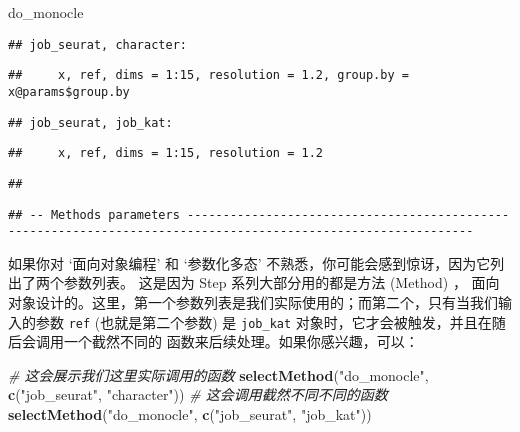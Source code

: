 \documentclass[
]{article}
\newenvironment{Shaded}{\begin{snugshade}}{\end{snugshade}}
\newcommand{\CommentTok}[1]{\textcolor[rgb]{0.56,0.35,0.01}{\textit{#1}}}
\newcommand{\KeywordTok}[1]{\textcolor[rgb]{0.13,0.29,0.53}{\textbf{#1}}}
\newcommand{\NormalTok}[1]{#1}
\newcommand{\StringTok}[1]{\textcolor[rgb]{0.31,0.60,0.02}{#1}}
\begin{document}
\begin{Shaded}
\begin{Highlighting}[]
\NormalTok{do\_monocle}
\end{Highlighting}
\end{Shaded}

\begin{verbatim}
## job_seurat, character:
\end{verbatim}

\begin{verbatim}
##     x, ref, dims = 1:15, resolution = 1.2, group.by = x@params$group.by
\end{verbatim}

\begin{verbatim}
## job_seurat, job_kat:
\end{verbatim}

\begin{verbatim}
##     x, ref, dims = 1:15, resolution = 1.2
\end{verbatim}

\begin{verbatim}
## 
\end{verbatim}

\begin{verbatim}
## -- Methods parameters --------------------------------------------------------------------------------------------------------------
\end{verbatim}

如果你对 `面向对象编程' 和 `参数化多态' 不熟悉，你可能会感到惊讶，因为它列出了两个参数列表。
这是因为 Step 系列大部分用的都是方法 (Method) ，
面向对象设计的。这里，第一个参数列表是我们实际使用的；而第二个，只有当我们输入的参数 \texttt{ref}
(也就是第二个参数) 是 \texttt{job\_kat} 对象时，它才会被触发，并且在随后会调用一个截然不同的
函数来后续处理。如果你感兴趣，可以：

\begin{Shaded}
\begin{Highlighting}[]
\CommentTok{\# 这会展示我们这里实际调用的函数}
\KeywordTok{selectMethod}\NormalTok{(}\StringTok{"do\_monocle"}\NormalTok{, }\KeywordTok{c}\NormalTok{(}\StringTok{"job\_seurat"}\NormalTok{, }\StringTok{"character"}\NormalTok{))}
\CommentTok{\# 这会调用截然不同不同的函数}
\KeywordTok{selectMethod}\NormalTok{(}\StringTok{"do\_monocle"}\NormalTok{, }\KeywordTok{c}\NormalTok{(}\StringTok{"job\_seurat"}\NormalTok{, }\StringTok{"job\_kat"}\NormalTok{))}
\end{Highlighting}
\end{Shaded}
\end{document}
